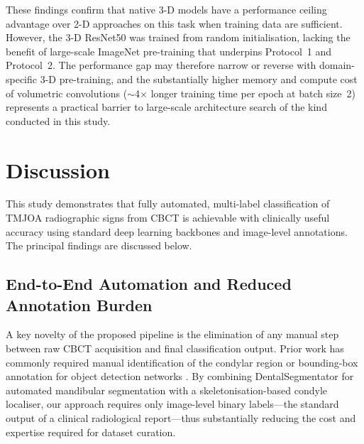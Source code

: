 \documentclass[review,12pt]{elsarticle}
\begin{document}
These findings confirm that native 3-D models have a performance
ceiling advantage over 2-D approaches on this task when training data
are sufficient. However, the 3-D ResNet50 was trained from random
initialisation, lacking the benefit of large-scale ImageNet
pre-training that underpins Protocol~1 and Protocol~2. The
performance gap may therefore narrow or reverse with domain-specific
3-D pre-training, and the substantially higher memory and compute cost
of volumetric convolutions ($\sim$4$\times$ longer training time per
epoch at batch size~2) represents a practical barrier to large-scale
architecture search of the kind conducted in this study.

\section{Discussion}
\label{sec:discussion}

This study demonstrates that fully automated, multi-label classification
of TMJOA radiographic signs from CBCT is achievable with clinically
useful accuracy using standard deep learning backbones and image-level
annotations. The principal findings are discussed below.

\subsection{End-to-End Automation and Reduced Annotation Burden}

A key novelty of the proposed pipeline is the elimination of any manual
step between raw CBCT acquisition and final classification output. Prior
work has commonly required manual identification of the condylar
region \cite{ecser2023classification,choi2025artificial} or bounding-box annotation for
object detection networks \cite{Ariji2019,Kuwana2021}. By combining
DentalSegmentator \cite{dot2024dentalsegmentator} for automated mandibular
segmentation with a skeletonisation-based condyle localiser, our approach
requires only image-level binary labels---the standard output of a
clinical radiological report---thus substantially reducing the cost and
expertise required for dataset curation.
\end{document}

